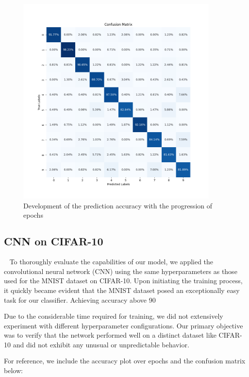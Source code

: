 \documentclass[onecolumn,10pt,cleanfoot]{asme2ej}
\begin{document}
\begin{figure}[H]
  \centering
	\includegraphics[width=0.9\textwidth, height=0.75\textwidth]{conf_mat_mnist28.png}
	\caption{Development of the prediction accuracy with the progression of epochs}
  \label{fig:MINST_conf}
\end{figure}

\subsection{CNN on CIFAR-10} 
To thoroughly evaluate the capabilities of our model, we applied the convolutional neural network (CNN) using the same hyperparameters as those used for the MNIST dataset on CIFAR-10. Upon initiating the training process, it quickly became evident that the MNIST dataset posed an exceptionally easy task for our classifier. Achieving accuracy above 90%

Due to the considerable time required for training, we did not extensively experiment with different hyperparameter configurations. Our primary objective was to verify that the network performed well on a distinct dataset like CIFAR-10 and did not exhibit any unusual or unpredictable behavior.

For reference, we include the accuracy plot over epochs and the confusion matrix below:
\end{document}

